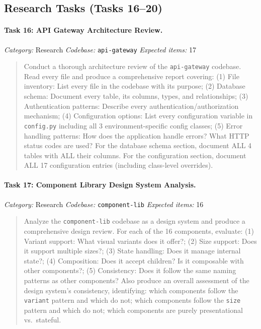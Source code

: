\subsection{Research Tasks (Tasks 16--20)}

\paragraph{Task 16: API Gateway Architecture Review.}
\textit{Category:} Research \quad
\textit{Codebase:} \texttt{api-gateway} \quad
\textit{Expected items:} 17

\begin{quote}
Conduct a thorough architecture review of the \texttt{api-gateway} codebase. Read every file and produce a comprehensive report covering: (1) File inventory: List every file in the codebase with its purpose; (2) Database schema: Document every table, its columns, types, and relationships; (3) Authentication patterns: Describe every authentication/authorization mechanism; (4) Configuration options: List every configuration variable in \texttt{config.py} including all 3 environment-specific config classes; (5) Error handling patterns: How does the application handle errors? What HTTP status codes are used? For the database schema section, document ALL 4 tables with ALL their columns. For the configuration section, document ALL 17 configuration entries (including class-level overrides).
\end{quote}

\paragraph{Task 17: Component Library Design System Analysis.}
\textit{Category:} Research \quad
\textit{Codebase:} \texttt{component-lib} \quad
\textit{Expected items:} 16

\begin{quote}
Analyze the \texttt{component-lib} codebase as a design system and produce a comprehensive design review. For each of the 16 components, evaluate: (1) Variant support: What visual variants does it offer?; (2) Size support: Does it support multiple sizes?; (3) State handling: Does it manage internal state?; (4) Composition: Does it accept children? Is it composable with other components?; (5) Consistency: Does it follow the same naming patterns as other components? Also produce an overall assessment of the design system's consistency, identifying: which components follow the \texttt{variant} pattern and which do not; which components follow the \texttt{size} pattern and which do not; which components are purely presentational vs.\ stateful.
\end{quote}

